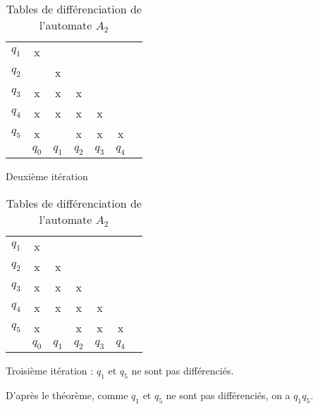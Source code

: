 \begin{example}
\begin{table}[H]
 \vspace{0.5cm}

 \begin{subtable}{.5\textwidth}
 \centering
 \begin{tabular}{ccccccc}
	 \cline{2-2}
	 \multicolumn{1}{c|}{$q_1$} & \multicolumn{1}{c|}{x} &&&&\\
	 \cline{2-3}
	 \multicolumn{1}{c|}{$q_2$} & \multicolumn{1}{c|}{} &\multicolumn{1}{c|}{x}&&&\\
	 \cline{2-4}
	 \multicolumn{1}{c|}{$q_3$} & \multicolumn{1}{c|}{x} &\multicolumn{1}{c|}{x}&\multicolumn{1}{c|}{x}&&\\
	 \cline{2-5}
	 \multicolumn{1}{c|}{$q_4$} & \multicolumn{1}{c|}{x} &\multicolumn{1}{c|}{x}&\multicolumn{1}{c|}{x}&\multicolumn{1}{c|}{x}&\\
	 \cline{2-6}
	 \multicolumn{1}{c|}{$q_5$} & \multicolumn{1}{c|}{x} & \multicolumn{1}{c|}{}&\multicolumn{1}{c|}{x}&\multicolumn{1}{c|}{x}&\multicolumn{1}{c|}{x}\\
	 \cline{2-6}
	 \multicolumn{1}{c}{} & $q_0$&$q_1$&$q_2$&$q_3$&$q_4$\\
 \end{tabular}
 \caption{Deuxième itération}
 \end{subtable}
 \begin{subtable}{.5\textwidth}
 \centering
 \begin{tabular}{ccccccc}
	 \cline{2-2}
	 \multicolumn{1}{c|}{$q_1$} & \multicolumn{1}{c|}{x} &&&&\\
	 \cline{2-3}
	 \multicolumn{1}{c|}{$q_2$} & \multicolumn{1}{c|}{x} &\multicolumn{1}{c|}{x}&&&\\
	 \cline{2-4}
	 \multicolumn{1}{c|}{$q_3$} & \multicolumn{1}{c|}{x} &\multicolumn{1}{c|}{x}&\multicolumn{1}{c|}{x}&&\\
	 \cline{2-5}
	 \multicolumn{1}{c|}{$q_4$} & \multicolumn{1}{c|}{x} &\multicolumn{1}{c|}{x}&\multicolumn{1}{c|}{x}&\multicolumn{1}{c|}{x}&\\
	 \cline{2-6}
	 \multicolumn{1}{c|}{$q_5$} & \multicolumn{1}{c|}{x} & \multicolumn{1}{c|}{}&\multicolumn{1}{c|}{x}&\multicolumn{1}{c|}{x}&\multicolumn{1}{c|}{x}\\
	 \cline{2-6}
	 \multicolumn{1}{c}{} & $q_0$&$q_1$&$q_2$&$q_3$&$q_4$\\
 \end{tabular}
 \caption{Troisième itération : $q_1$ et $q_5$ ne sont pas différenciés.}
\end{subtable}
\caption{Tables de différenciation de l'automate $A_2$}
\label{tab:tfaa2}
\end{table}

D'après le théorème, comme $q_1$ et $q_5$ ne sont pas différenciés, on a $q_1$\rf$q_5$.

\end{example}



